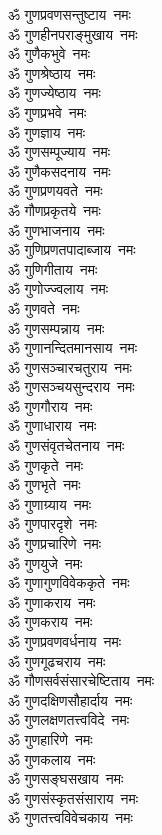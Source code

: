 \begin{multicols}{2}
\begin{flushleft}
ॐ गुणप्रवणसन्तुष्टाय~नमः\\
ॐ गुणहीनपराङ्मुखाय~नमः\\
ॐ गुणैकभुवे~नमः\\
ॐ गुणश्रेष्ठाय~नमः\\
ॐ गुणज्येष्ठाय~नमः\hfill{}\\
ॐ गुणप्रभवे~नमः\\
ॐ गुणज्ञाय~नमः\\
ॐ गुणसम्पूज्याय~नमः\\
ॐ गुणैकसदनाय~नमः\\
ॐ गुणप्रणयवते~नमः\\
ॐ गौणप्रकृतये~नमः\\
ॐ गुणभाजनाय~नमः\\
ॐ गुणिप्रणतपादाब्जाय~नमः\\
ॐ गुणिगीताय~नमः\\
ॐ गुणोज्ज्वलाय~नमः\hfill{}\\
ॐ गुणवते~नमः\\
ॐ गुणसम्पन्नाय~नमः\\
ॐ गुणानन्दितमानसाय~नमः\\
ॐ गुणसञ्चारचतुराय~नमः\\
ॐ गुणसञ्चयसुन्दराय~नमः\\
ॐ गुणगौराय~नमः\\
ॐ गुणाधाराय~नमः\\
ॐ गुणसंवृतचेतनाय~नमः\\
ॐ गुणकृते~नमः\\
ॐ गुणभृते~नमः\hfill{}\\
ॐ गुणाग्र्याय~नमः\\
ॐ गुणपारदृशे~नमः\\
ॐ गुणप्रचारिणे~नमः\\
ॐ गुणयुजे~नमः\\
ॐ गुणागुणविवेककृते~नमः\\
ॐ गुणाकराय~नमः\\
ॐ गुणकराय~नमः\\
ॐ गुणप्रवणवर्धनाय~नमः\\
ॐ गुणगूढचराय~नमः\\
ॐ गौणसर्वसंसारचेष्टिताय~नमः\hfill{}\\
ॐ गुणदक्षिणसौहार्दाय~नमः\\
ॐ गुणलक्षणतत्त्वविदे~नमः\\
ॐ गुणहारिणे~नमः\\
ॐ गुणकलाय~नमः\\
ॐ गुणसङ्घसखाय~नमः\\
ॐ गुणसंस्कृतसंसाराय~नमः\\
ॐ गुणतत्त्वविवेचकाय~नमः\\

\end{flushleft}
\end{multicols}
